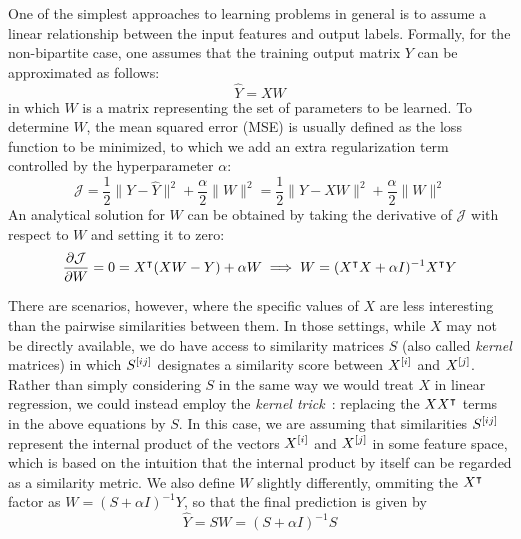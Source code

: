 One of the simplest approaches to learning problems in general is to assume a linear relationship between the input features and output labels. Formally, for the non-bipartite case, one assumes that the training output matrix $Y$ can be approximated as follows:
%
\begin{equation}
    \hat Y = X W
\end{equation}
%
in which $W$ is a matrix representing the set of parameters to be learned. To determine $W$, the mean squared error (MSE) is usually defined as the loss function to be minimized, to which we add an extra regularization term controlled by the hyperparameter $\alpha$:
%
\begin{equation}
    \mathcal{J} = \frac{1}{2} \|Y - \hat Y\|^2 + \frac{\alpha}{2} \|W\|^2
    = \frac{1}{2} \|Y - XW\|^2 + \frac{\alpha}{2} \|W\|^2
\end{equation}
%
An analytical solution for $W$ can be obtained by taking the derivative of $\mathcal{J}$ with respect to $W$ and setting it to zero:
%
\begin{equation} %
    \frac{\partial \mathcal{J}}{\partial W} = 0
    = X\T (XW - Y) + \alpha W
    \implies W = (X\T X + \alpha I)^{-1} X\T Y
\end{equation}

There are scenarios, however, where the specific values of $X$ are less interesting than the pairwise similarities between them. In those settings, while $X$ may not be directly available, we do have access to similarity matrices $S$ (also called \emph{kernel} matrices) in which $S^{[ij]}$ designates a similarity score between $X^{[i]}$ and $X^{[j]}$. Rather than simply considering $S$ in the same way we would treat $X$ in linear regression, we could instead employ the \emph{kernel trick}~\cite{murphy2012machine}: replacing the $XX^\intercal$ terms in the above equations by $S$. In this case, we are assuming that similarities $S^{[ij]}$ represent the internal product of the vectors $X^{[i]}$ and $X^{[j]}$ in some feature space, which is based on the intuition that the internal product by itself can be regarded as a similarity metric.
%
We also define $W$ slightly differently, ommiting the $X^\intercal$ factor as $W = (S + \alpha I)^{-1} Y$, so that the final prediction is given by
%
\begin{equation}
    \hat Y = S W = (S + \alpha I)^{-1} S
\end{equation}

